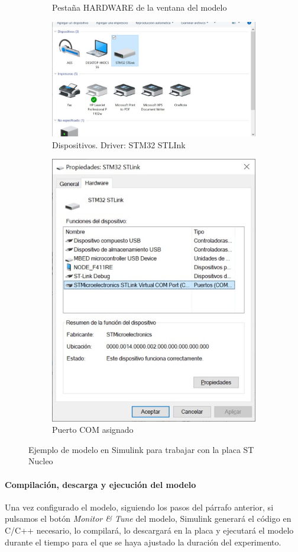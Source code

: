 \documentclass[10pt,a4paper]{report}
\begin{document}
\begin{figure}
\begin{subfigure}{0.5\textwidth}
\caption{Pestaña HARDWARE de la ventana del modelo}\label{f17f}
\end{subfigure}
\begin{subfigure}{0.5\textwidth}
\centering
\includegraphics[width = \linewidth]{eje7.jpg}
\caption{Dispositivos. Driver: STM32 STLInk}\label{f17g}
\end{subfigure}
\begin{subfigure}{0.5\textwidth}
\centering
\includegraphics[width = 0.6\linewidth]{eje8.jpg}
\caption{Puerto COM asignado}\label{f17h}
\end{subfigure}

\caption{Ejemplo de modelo en Simulink para trabajar con la placa ST Nucleo}\label{f17}
\end{figure} 

\paragraph{Compilación, descarga y ejecución del modelo}
Una vez configurado el modelo, siguiendo los pasos del párrafo anterior, si pulsamos el botón \emph{Monitor \& Tune} del modelo, Simulink generará el código en C/C++ necesario, lo compilará, lo descargará en la placa y ejecutará el modelo durante el tiempo para el que se haya ajustado la duración del experimento.
\end{document}
